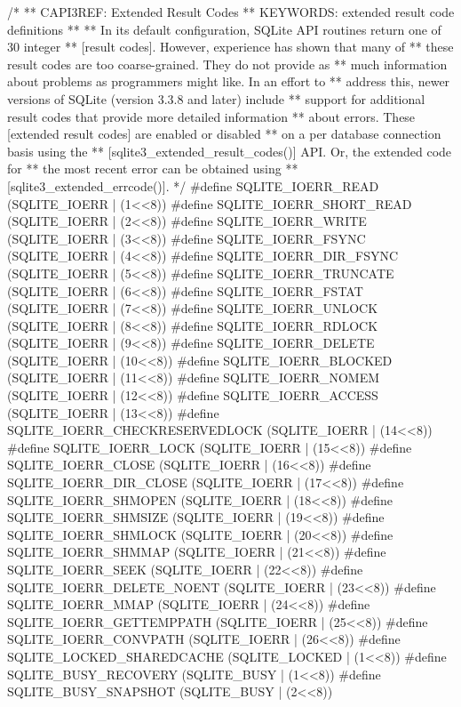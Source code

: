 \begin{Codex}[label=sqlite3.h,numbers=left]
{/*
** CAPI3REF: Extended Result Codes
** KEYWORDS: {extended result code definitions}
**
** In its default configuration, SQLite API routines return one of 30 integer
** [result codes].  However, experience has shown that many of
** these result codes are too coarse-grained.  They do not provide as
** much information about problems as programmers might like.  In an effort to
** address this, newer versions of SQLite (version 3.3.8 and later) include
** support for additional result codes that provide more detailed information
** about errors. These [extended result codes] are enabled or disabled
** on a per database connection basis using the
** [sqlite3_extended_result_codes()] API.  Or, the extended code for
** the most recent error can be obtained using
** [sqlite3_extended_errcode()].
*/
#define SQLITE_IOERR_READ              (SQLITE_IOERR | (1<<8))
#define SQLITE_IOERR_SHORT_READ        (SQLITE_IOERR | (2<<8))
#define SQLITE_IOERR_WRITE             (SQLITE_IOERR | (3<<8))
#define SQLITE_IOERR_FSYNC             (SQLITE_IOERR | (4<<8))
#define SQLITE_IOERR_DIR_FSYNC         (SQLITE_IOERR | (5<<8))
#define SQLITE_IOERR_TRUNCATE          (SQLITE_IOERR | (6<<8))
#define SQLITE_IOERR_FSTAT             (SQLITE_IOERR | (7<<8))
#define SQLITE_IOERR_UNLOCK            (SQLITE_IOERR | (8<<8))
#define SQLITE_IOERR_RDLOCK            (SQLITE_IOERR | (9<<8))
#define SQLITE_IOERR_DELETE            (SQLITE_IOERR | (10<<8))
#define SQLITE_IOERR_BLOCKED           (SQLITE_IOERR | (11<<8))
#define SQLITE_IOERR_NOMEM             (SQLITE_IOERR | (12<<8))
#define SQLITE_IOERR_ACCESS            (SQLITE_IOERR | (13<<8))
#define SQLITE_IOERR_CHECKRESERVEDLOCK (SQLITE_IOERR | (14<<8))
#define SQLITE_IOERR_LOCK              (SQLITE_IOERR | (15<<8))
#define SQLITE_IOERR_CLOSE             (SQLITE_IOERR | (16<<8))
#define SQLITE_IOERR_DIR_CLOSE         (SQLITE_IOERR | (17<<8))
#define SQLITE_IOERR_SHMOPEN           (SQLITE_IOERR | (18<<8))
#define SQLITE_IOERR_SHMSIZE           (SQLITE_IOERR | (19<<8))
#define SQLITE_IOERR_SHMLOCK           (SQLITE_IOERR | (20<<8))
#define SQLITE_IOERR_SHMMAP            (SQLITE_IOERR | (21<<8))
#define SQLITE_IOERR_SEEK              (SQLITE_IOERR | (22<<8))
#define SQLITE_IOERR_DELETE_NOENT      (SQLITE_IOERR | (23<<8))
#define SQLITE_IOERR_MMAP              (SQLITE_IOERR | (24<<8))
#define SQLITE_IOERR_GETTEMPPATH       (SQLITE_IOERR | (25<<8))
#define SQLITE_IOERR_CONVPATH          (SQLITE_IOERR | (26<<8))
#define SQLITE_LOCKED_SHAREDCACHE      (SQLITE_LOCKED |  (1<<8))
#define SQLITE_BUSY_RECOVERY           (SQLITE_BUSY   |  (1<<8))
#define SQLITE_BUSY_SNAPSHOT           (SQLITE_BUSY   |  (2<<8))
}
\end{Codex}
